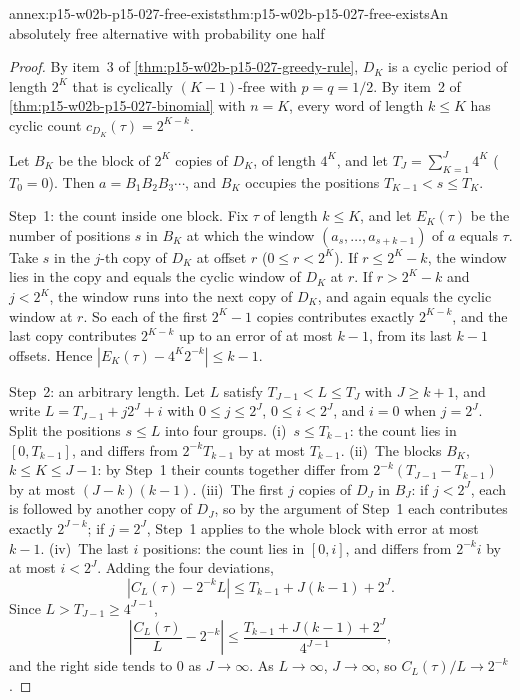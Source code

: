 \begin{annexitem}{annex:p15-w02b-p15-027-free-exists}{thm:p15-w02b-p15-027-free-exists}{An absolutely free alternative with probability one half}
\begin{proof}
By item~3 of \cref{thm:p15-w02b-p15-027-greedy-rule}, \(D_K\) is a cyclic
period of length \(2^K\) that is cyclically \((K-1)\)-free with
\(p=q=1/2\). By item~2 of \cref{thm:p15-w02b-p15-027-binomial} with
\(n=K\), every word of length \(k\leq K\) has cyclic count
\(c_{D_K}(\tau)=2^{K-k}\).

Let \(B_K\) be the block of \(2^K\) copies of \(D_K\), of length
\(4^K\), and let \(T_J=\sum_{K=1}^J4^K\) (\(T_0=0\)). Then
\(a=B_1B_2B_3\cdots\), and \(B_K\) occupies the positions
\(T_{K-1}<s\leq T_K\).

Step~1: the count inside one block. Fix \(\tau\) of length \(k\leq K\),
and let \(E_K(\tau)\) be the number of positions \(s\) in \(B_K\) at which
the window \((a_s,\ldots,a_{s+k-1})\) of \(a\) equals \(\tau\). Take \(s\)
in the \(j\)-th copy of \(D_K\) at offset \(r\) (\(0\leq r<2^K\)). If
\(r\leq2^K-k\), the window lies in the copy and equals the cyclic window
of \(D_K\) at \(r\). If \(r>2^K-k\) and \(j<2^K\), the window runs into the
next copy of \(D_K\), and again equals the cyclic window at \(r\). So each
of the first \(2^K-1\) copies contributes exactly \(2^{K-k}\), and the last
copy contributes \(2^{K-k}\) up to an error of at most \(k-1\), from its
last \(k-1\) offsets. Hence \(|E_K(\tau)-4^K2^{-k}|\leq k-1\).

Step~2: an arbitrary length. Let \(L\) satisfy \(T_{J-1}<L\leq T_J\) with
\(J\geq k+1\), and write \(L=T_{J-1}+j2^J+i\) with \(0\leq j\leq2^J\),
\(0\leq i<2^J\), and \(i=0\) when \(j=2^J\). Split the positions
\(s\leq L\) into four groups.
(i)~\(s\leq T_{k-1}\): the count lies in \([0,T_{k-1}]\), and differs from
\(2^{-k}T_{k-1}\) by at most \(T_{k-1}\).
(ii)~The blocks \(B_K\), \(k\leq K\leq J-1\): by Step~1 their counts
together differ from \(2^{-k}(T_{J-1}-T_{k-1})\) by at most
\((J-k)(k-1)\).
(iii)~The first \(j\) copies of \(D_J\) in \(B_J\): if \(j<2^J\), each is
followed by another copy of \(D_J\), so by the argument of Step~1 each
contributes exactly \(2^{J-k}\); if \(j=2^J\), Step~1 applies to the
whole block with error at most \(k-1\).
(iv)~The last \(i\) positions: the count lies in \([0,i]\), and differs
from \(2^{-k}i\) by at most \(i<2^J\).
Adding the four deviations,
\[
 |C_L(\tau)-2^{-k}L|\leq T_{k-1}+J(k-1)+2^J .
\]
Since \(L>T_{J-1}\geq4^{J-1}\),
\[
 \left|\frac{C_L(\tau)}{L}-2^{-k}\right|
 \leq\frac{T_{k-1}+J(k-1)+2^J}{4^{J-1}},
\]
and the right side tends to \(0\) as \(J\to\infty\). As \(L\to\infty\),
\(J\to\infty\), so \(C_L(\tau)/L\to2^{-k}\).


\end{proof}
\end{annexitem}
